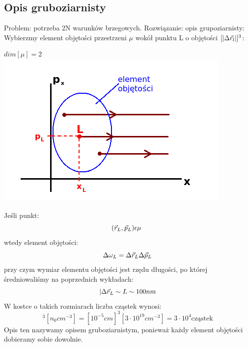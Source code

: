 \subsection{Opis gruboziarnisty}
Problem: potrzeba 2N warunków brzegowych.
Rozwiązanie: opis grupoziarnisty:\\
Wybierzmy element objętości przestrzeni $\mu$ wokół punktu L o objętości $[|\Delta \vec{r}_l|]^3$:
\begin{center}$dim[\mu]=2$\\
\includegraphics[scale=0.75] {obrazki/przestrzen_fazowa2.png}
\end{center}
Jeśli punkt:
\begin{equation} (\vec{r}_L,\vec{p}_L)\epsilon\mu~ \nonumber \end{equation}
wtedy element objętości:
\begin{equation}\Delta\omega_L=\Delta\vec{r}_L\Delta\vec{p}_L\end{equation}
przy czym wymiar elementu objętości jest rzędu długości, po której średniowaliśmy na poprzednich wykładach:
\begin{equation}|\Delta\vec{r}_L\sim L\sim 100nm\end{equation}
W kostce o takich rozmiarach liczba cząstek wynosi:
\begin{equation}[|\Delta\r_L|]^3[n_0 cm^{-3}]=[10^{-5}cm]^3[3\cdot10^{19}cm^{-3}]=3\cdot 10^4 \text{cząstek}\nonumber\end{equation}
Opis ten nazywamy opisem gruboziarnistym, ponieważ każdy element objętości dobieramy sobie dowolnie.
